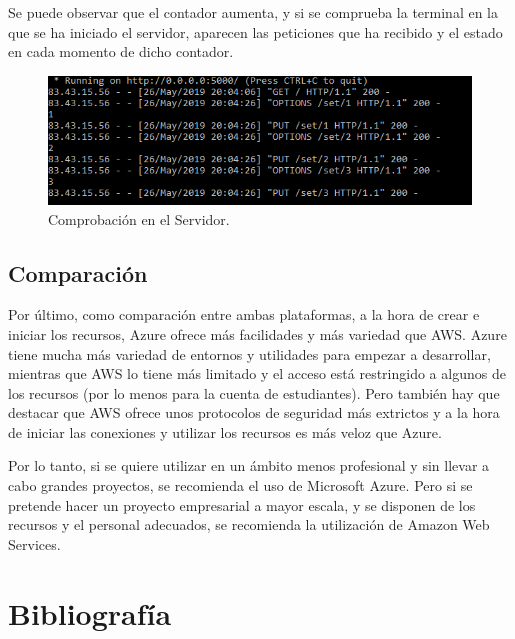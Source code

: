 \documentclass[english,runningheads,a4paper]{llncs}[2018/03/10]
\begin{document}
Se puede observar que el contador aumenta, y si se comprueba la terminal en la que
se ha iniciado el servidor, aparecen las peticiones que ha recibido y el estado en
cada momento de dicho contador.

\begin{figure}[h!]
 \includegraphics[width=\linewidth]{./Web/Azure/Comprobacion.png}
 \caption{Comprobación en el Servidor.}
\end{figure}

\subsection{Comparación}

Por último, como comparación entre ambas plataformas, a la hora de crear e iniciar
los recursos, Azure ofrece más facilidades y más variedad que AWS. Azure tiene
mucha más variedad de entornos y utilidades para empezar a desarrollar, mientras
que AWS lo tiene más limitado y el acceso está restringido a algunos de los
recursos (por lo menos para la cuenta de estudiantes). Pero también hay que
destacar que AWS ofrece unos protocolos de seguridad más extrictos y a la hora de
iniciar las conexiones y utilizar los recursos es más veloz que Azure.

Por lo tanto, si se quiere utilizar en un ámbito menos profesional y sin llevar a
cabo grandes proyectos, se recomienda el uso de Microsoft Azure. Pero si se
pretende hacer un proyecto empresarial a mayor escala, y se disponen de los
recursos y el personal adecuados, se recomienda la utilización de Amazon Web
Services.

\newpage



\section*{Bibliografía}

\newpage
\printbibliography
\end{document}
